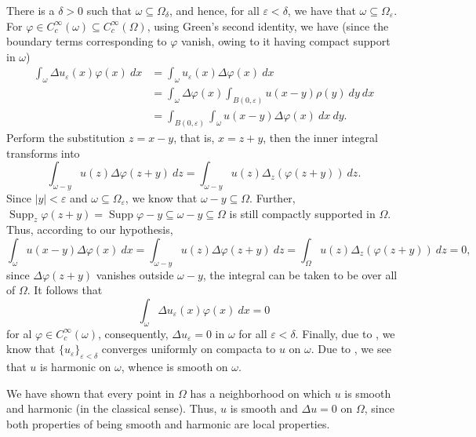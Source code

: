 \documentclass[10pt]{amsart}
\theoremstyle{thmstyle}
\theoremstyle{defstyle}
\newcommand{\Supp}{\operatorname{Supp}}
\begin{document}
There is a $\delta > 0$ such that $\omega\subseteq\Omega_\delta$, and hence, for all $\varepsilon < \delta$, we have that $\omega\subseteq\Omega_\varepsilon$. For $\varphi\in C_c^\infty(\omega)\subseteq C_c^\infty(\Omega)$, using Green's second identity, we have (since the boundary terms corresponding to $\varphi$ vanish, owing to it having compact support in $\omega$)
\begin{align*}
	\int_{\omega}\Delta u_\varepsilon(x)\varphi(x)~dx &= \int_{\omega} u_\varepsilon(x)\Delta\varphi(x)~dx\\
	&= \int_{\omega}\Delta\varphi(x)\int_{B(0,\varepsilon)} u(x - y)\rho(y)~dy~dx\\
	&= \int_{B(0,\varepsilon)} \int_\omega u(x - y)\Delta\varphi(x)~dx~dy.
\end{align*}
Perform the substitution $z = x - y$, that is, $x = z + y$, then the inner integral transforms into 
\begin{equation*}
	\int_{\omega - y} u(z)\Delta\varphi(z + y)~dz = \int_{\omega - y} u(z)\Delta_z(\varphi(z + y))~dz.
\end{equation*}
Since $|y| < \varepsilon$ and $\omega\subseteq\Omega_\varepsilon$, we know that $\omega - y\subseteq\Omega$. Further, $\Supp_z\varphi(z + y) = \Supp\varphi - y\subseteq\omega - y\subseteq\Omega$ is still compactly supported in $\Omega$. Thus, according to our hypothesis,
\begin{equation*}
	\int_\omega u(x - y)\Delta\varphi(x)~dx = \int_{\omega - y} u(z)\Delta\varphi(z + y)~dz = \int_{\Omega}u(z)\Delta_z\left(\varphi(z + y)\right)~dz = 0,
\end{equation*}
since $\Delta\varphi(z + y)$ vanishes outside $\omega - y$, the integral can be taken to be over all of $\Omega$. It follows that 
\begin{equation*}
	\int_{\omega}\Delta u_\varepsilon(x)\varphi(x)~dx = 0
\end{equation*}
for al $\varphi\in C_c^\infty(\omega)$, consequently, $\Delta u_\varepsilon = 0$ in $\omega$ for all $\varepsilon < \delta$. Finally, due to , we know that $\{u_\varepsilon\}_{\varepsilon < \delta}$ converges uniformly on compacta to $u$ on $\omega$. Due to , we see that $u$ is harmonic on $\omega$, whence is smooth on $\omega$. 

We have shown that every point in $\Omega$ has a neighborhood on which $u$ is smooth and harmonic (in the classical sense). Thus, $u$ is smooth and $\Delta u = 0$ on $\Omega$, since both properties of being smooth and harmonic are local properties.
\end{document}
